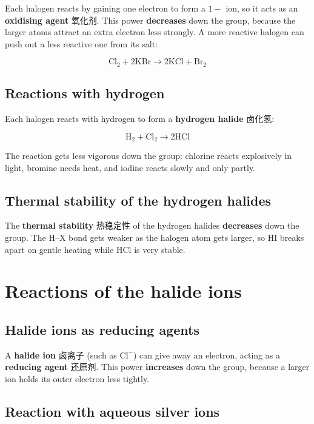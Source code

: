 \documentclass[11pt]{article}
\begin{document}
Each halogen reacts by gaining one electron to form a $1-$ ion, so it acts as an \textbf{oxidising agent} 氧化剂. This power \textbf{decreases} down the group, because the larger atoms attract an extra electron less strongly. A more reactive halogen can push out a less reactive one from its salt:

\[
\text{Cl}_2 + 2\text{KBr} \rightarrow 2\text{KCl} + \text{Br}_2
\]

\subsection*{Reactions with hydrogen}

Each halogen reacts with hydrogen to form a \textbf{hydrogen halide} 卤化氢:

\[
\text{H}_2 + \text{Cl}_2 \rightarrow 2\text{HCl}
\]

The reaction gets less vigorous down the group: chlorine reacts explosively in light, bromine needs heat, and iodine reacts slowly and only partly.

\subsection*{Thermal stability of the hydrogen halides}

The \textbf{thermal stability} 热稳定性 of the hydrogen halides \textbf{decreases} down the group. The H–X bond gets weaker as the halogen atom gets larger, so HI breaks apart on gentle heating while HCl is very stable.

\section*{Reactions of the halide ions}

\subsection*{Halide ions as reducing agents}

A \textbf{halide ion} 卤离子 (such as $\text{Cl}^-$) can give away an electron, acting as a \textbf{reducing agent} 还原剂. This power \textbf{increases} down the group, because a larger ion holds its outer electron less tightly.

\subsection*{Reaction with aqueous silver ions}
\end{document}
